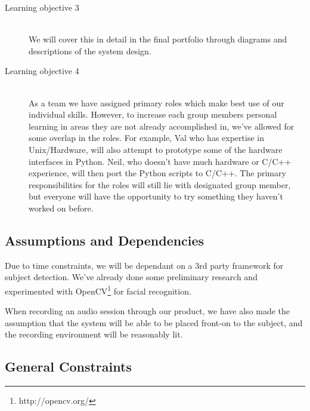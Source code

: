 \documentclass[11pt,a4paper,titlepage]{report}
\begin{document}
\begin{description}
  \item[Learning objective 3] \hfill \\
We will cover this in detail in the final portfolio through diagrams and descriptions of the system design.

  \item[Learning objective 4] \hfill \\
As a team we have assigned primary roles which make best use of our individual skills. However, to increase each group members personal learning in areas they are not already accomplished in, we've allowed for some overlap in the roles. For example, Val who has expertise in Unix/Hardware, will also attempt to prototype some of the hardware interfaces in Python. Neil, who doesn't have much hardware or C/C++ experience, will then port the Python scripts to C/C++. The primary responsibilities for the roles will still lie with designated group member, but everyone will have the opportunity to try something they haven't worked on before.

\end{description}




\subsection{Assumptions and Dependencies}

Due to time constraints, we will be dependant on a 3rd party framework for subject detection. We've already done some preliminary research and experimented with OpenCV\footnote{http://opencv.org/} for facial recognition.

When recording an audio session through our product, we have also made the assumption that the system will be able to be placed front-on to the subject, and the recording environment will be reasonably lit.


\subsection{General Constraints}
\end{document}

